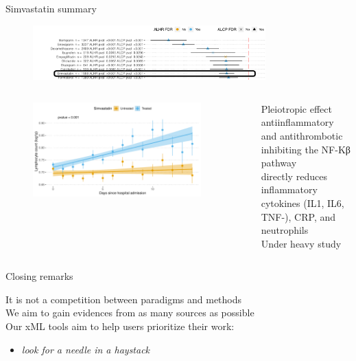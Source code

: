 \documentclass[compress,ignorenonframetext,aspectratio=1610,handout]{beamer}
\begin{document}
\begin{frame}{Simvastatin summary}

	\begin{figure}
		\includegraphics[width=0.8\textwidth]{figs/results/simvastatin_summary_.png}	
	\end{figure}
		
	\begin{columns}
			
		\begin{figure}
			\includegraphics[width=0.9\textwidth]{figs/results/db00641_simvastatin_lymphocite_progression.pdf}	
		\end{figure}

		Pleiotropic effect\\
		antiinflammatory and antithrombotic\\
		inhibiting the NF-Kβ pathway\\
		directly reduces inflammatory cytokines (IL1, IL6, TNF-\textalpha), CRP, and neutrophils\\
		Under heavy study

	\end{columns}

\end{frame}

\begin{frame}{Closing remarks}
	
	It is not a competition between paradigms and methods \\

	We aim to gain evidences from as many sources as possible \\

	Our xML tools aim to help users prioritize their work:
	\begin{itemize}
		\item  \textit{look for a needle in a haystack}
	\end{itemize}

\end{frame}
\end{document}
